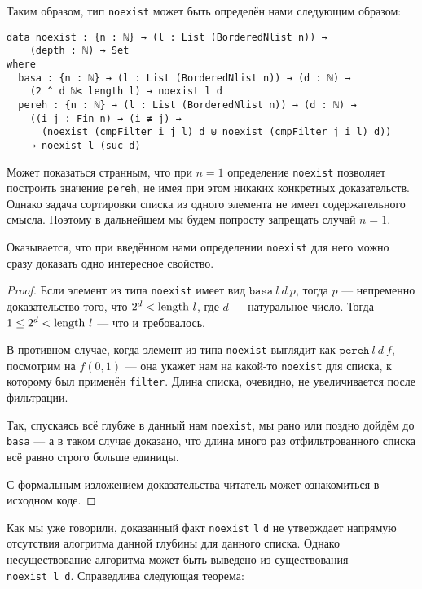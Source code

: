 \abz Таким образом, тип {\tt noexist} может быть определён нами следующим образом:

\begin{verbatim}
data noexist : {n : ℕ} → (l : List (BorderedNlist n)) →
    (depth : ℕ) → Set
where
  basa : {n : ℕ} → (l : List (BorderedNlist n)) → (d : ℕ) →
    (2 ^ d ℕ< length l) → noexist l d
  pereh : {n : ℕ} → (l : List (BorderedNlist n)) → (d : ℕ) →
    ((i j : Fin n) → (i ≢ j) →
      (noexist (cmpFilter i j l) d ⊎ noexist (cmpFilter j i l) d))
    → noexist l (suc d)
\end{verbatim}

Может показаться странным, что при $n=1$ определение {\tt noexist} позволяет построить значение {\tt pereh}, не имея при этом никаких конкретных доказательств. Однако задача сортировки списка из одного элемента не имеет содержательного смысла. Поэтому в дальнейшем мы будем попросту запрещать случай $n=1$.

\abz Оказывается, что при введённом нами определении {\tt noexist} для него можно сразу доказать одно интересное свойство.


\begin{proof}
Если элемент из типа {\tt noexist} имеет вид $\mathtt{basa}\ l\ d\ p$, тогда $p$ — непременно доказательство того, что $2^d < \mathrm{length}\  l$, где $d$ — натуральное число. Тогда $1 \le 2^d < \mathrm{length}\  l$ — что и требовалось.

\ms В противном случае, когда элемент из типа {\tt noexist} выглядит как $\mathtt{pereh}\ l\ d\ f$, посмотрим на $f(0,1)$ — она укажет нам на какой-то {\tt noexist} для списка, к которому был применён {\tt filter}. Длина списка, очевидно, не увеличивается после фильтрации.

\ms Так, спускаясь всё глубже в данный нам {\tt noexist}, мы рано или поздно дойдём до {\tt basa} — а в таком случае доказано, что длина много раз отфильтрованного списка всё равно строго больше единицы.

\ms С формальным изложением доказательства читатель может ознакомиться в исходном коде.
\end{proof}

Как мы уже говорили, доказанный факт {\tt noexist} {\tt l} {\tt d} не утверждает напрямую отсутствия алогритма данной глубины для данного списка. Однако несуществование алгоритма может быть выведено из существования {\tt noexist}~{\tt l}~{\tt d}. Справедлива следующая теорема:

